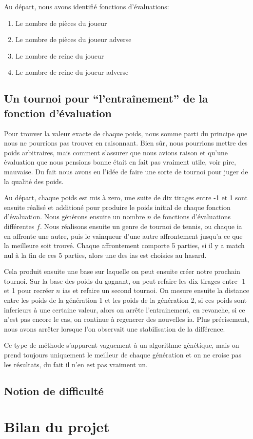 \documentclass[a4paper,11pt]{article}
\begin{document}
\begin{multicols}{2}[]
    Au départ, nous avons identifié fonctions d'évaluations:

    \begin{enumerate}
      \item Le nombre de pièces du joueur
      \item Le nombre de pièces du joueur adverse
      \item Le nombre de reine du joueur
      \item Le nombre de reine du joueur adverse
    \end{enumerate}

  \subsection{Un tournoi pour ``l'entraînement'' de la fonction d'évaluation}

    Pour trouver la valeur exacte de chaque poids, nous somme parti du principe
    que nous ne pourrions pas trouver en raisonnant. Bien sûr, nous pourrions
    mettre des poids arbitraires, mais comment s'assurer que nous avions raison
    et qu'une évaluation que nous pensions bonne était en fait pas vraiment
    utile, voir pire, mauvaise. Du fait nous avons eu l'idée de faire une sorte
    de tournoi pour juger de la qualité des poids.

    Au départ, chaque poids est mis à zero, une suite de dix tirages entre -1 et
    1 sont ensuite réalisé et additioné pour produire le poids initial de chaque
    fonction d'évaluation. Nous générons ensuite un nombre $n$ de fonctions
    d'évaluations différentes $f$. Nous réalisons ensuite un genre de tournoi de
    tennis, ou chaque ia en affronte une autre, puis le vainqueur d'une autre
    affrontement jusqu'a ce que la meilleure soit trouvé. Chaque affrontement
    comporte 5 parties, si il y a match nul à la fin de ces 5 parties, alors une
    des ias est choisies au hasard.

    Cela produit ensuite une base sur laquelle on peut ensuite créer notre
    prochain tournoi. Sur la base des poids du gagnant, on peut refaire les dix
    tirages entre -1 et 1 pour recréer $n$ ias et refaire un second tournoi. On
    mesure ensuite la distance entre les poids de la génération 1 et les poids
    de la génération 2, si ces poids sont inferieurs à une certaine valeur,
    alors on arrête l'entrainement, en revanche, si ce n'est pas encore le cas,
    on continue à regenerer des nouvelles ia. Plus précisement, nous avons
    arrêter lorsque l'on observait une stabilisation de la différence.

    Ce type de méthode s'apparent vaguement à un algorithme génétique, mais on
    prend toujours uniquement le meilleur de chaque génération et on ne croise
    pas les résultats, du fait il n'en est pas vraiment un.

  \subsection{Notion de difficulté}

\section{Bilan du projet}

\end{multicols}
\end{document}
